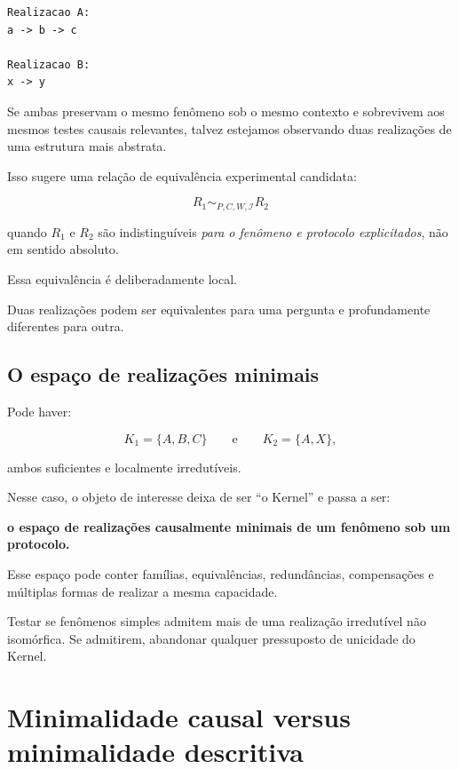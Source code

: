 \documentclass[11pt,a4paper]{article}
\begin{document}
\begin{lstlisting}
Realizacao A:
a -> b -> c

Realizacao B:
x -> y
\end{lstlisting}

Se ambas preservam o mesmo fenômeno sob o mesmo contexto e sobrevivem aos mesmos
testes causais relevantes, talvez estejamos observando duas realizações de uma
estrutura mais abstrata.

Isso sugere uma relação de equivalência experimental candidata:

\[
R_1 \sim_{P,C,W,\mathcal{I}} R_2
\]

quando \(R_1\) e \(R_2\) são indistinguíveis \emph{para o fenômeno e protocolo
explicitados}, não em sentido absoluto.

Essa equivalência é deliberadamente local.

Duas realizações podem ser equivalentes para uma pergunta e profundamente diferentes
para outra.

\subsection{O espaço de realizações minimais}

Pode haver:

\[
K_1=\{A,B,C\}
\qquad\text{e}\qquad
K_2=\{A,X\},
\]

ambos suficientes e localmente irredutíveis.

Nesse caso, o objeto de interesse deixa de ser ``o Kernel'' e passa a ser:

\begin{center}
\textbf{o espaço de realizações causalmente minimais de um fenômeno sob um protocolo.}
\end{center}

Esse espaço pode conter famílias, equivalências, redundâncias, compensações e
múltiplas formas de realizar a mesma capacidade.

\begin{markerbox}
Testar se fenômenos simples admitem mais de uma realização irredutível não isomórfica.
Se admitirem, abandonar qualquer pressuposto de unicidade do Kernel.
\end{markerbox}

\section{Minimalidade causal versus minimalidade descritiva}
\end{document}
